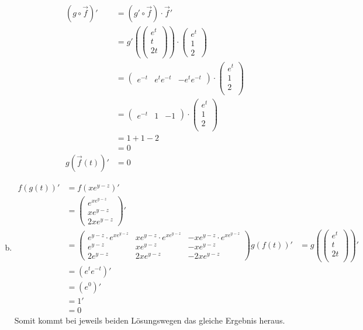 \documentclass[10pt,a4paper,parskip=half]{scrartcl}
\newcommand{\vecthree}[3]{\begin{pmatrix}#1\\#2\\#3\\\end {pmatrix}}
\begin{document}
\begin{enumerate}[(a)]
\begin{align*}
(g \circ \vec f)' &= (g' \circ \vec f) \cdot \vec f' \\
&= g'(\vecthree{e^t}{t}{2t}) \cdot \begin{pmatrix}e^t \\1 \\2 \end{pmatrix}\\
&= \begin{pmatrix}e^{-t} & e^te^{-t} & -e^te^{-t}\end{pmatrix} \cdot \vecthree{e^t}{1}{2} \\
&= \begin{pmatrix}e^{-t} & 1 & -1\end{pmatrix} \cdot \vecthree{e^t}{1}{2} \\
&= 1 + 1 - 2\\
&= 0\\
g(\vec f(t))' &= 0
\end{align*}
\item
\begin{align*}
f\left(g(t)\right)' &= f\left( xe^{y-z} \right)'\\
&= \begin{pmatrix}
e^{xe^{y-z}}\\
xe^{y-z}\\
2xe^{y-z}
\end{pmatrix}'\\
&= \begin{pmatrix}
e^{y-z} \cdot e^{xe^{y-z}} & xe^{y-z}\cdot e^{xe^{y-z}} & -xe^{y-z}\cdot e^{xe^{y-z}}\\
e^{y-z} & xe^{y-z} & -xe^{y-z}\\
2e^{y-z} & 2xe^{y-z} & -2xe^{y-z}
\end{pmatrix}
g(f(t))' &= g(\vecthree{e^t}{t}{2t})' \\
&= (e^te^{-t})' \\
&= (e^0)' \\
&= 1' \\
&= 0
\end{align*}
Somit kommt bei jeweils beiden Lösungswegen das gleiche Ergebnis heraus.
\end{enumerate}
\end{document}
